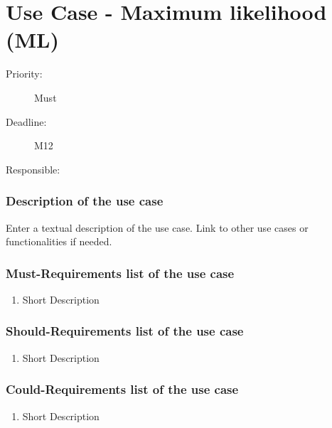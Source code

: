 \newpage
\section{Use Case - Maximum likelihood (ML)}
\label{UseCase:ML}

\begin{description}
\item[Priority:] Must
\item[Deadline:] M12
\item[Responsible:]
\end{description}

\subsubsection*{Description of the use case}

Enter a textual description of the use case. Link to other use cases or functionalities if needed. 


\subsubsection*{Must-Requirements list of the use case}

\begin{enumerate}
\item Short Description
\end{enumerate}

\subsubsection*{Should-Requirements list of the use case}

\begin{enumerate}
\item Short Description
\end{enumerate}

\subsubsection*{Could-Requirements list of the use case}

\begin{enumerate}
\item Short Description
\end{enumerate}


